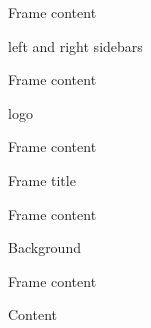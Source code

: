 \documentclass[10pt,blue,xcolor=pdftex,dvipsnames,table,handout]{beamer}
\begin{document}
		\begin{frame}[t]{Frame content}

			\begin{block} {left and right sidebars}
			\end{block}

		\end{frame}


		\begin{frame}[t]{Frame content}

			\begin{block} {logo}
			\end{block}

		\end{frame}

		\begin{frame}[t]{Frame content}

			\begin{block} {Frame title}
			\end{block}

		\end{frame}


		\begin{frame}[t]{Frame content}

			\begin{block} {Background}
			\end{block}

		\end{frame}


		\begin{frame}[t]{Frame content}

			\begin{block} {Content}
			\end{block}

		\end{frame}
\end{document}
